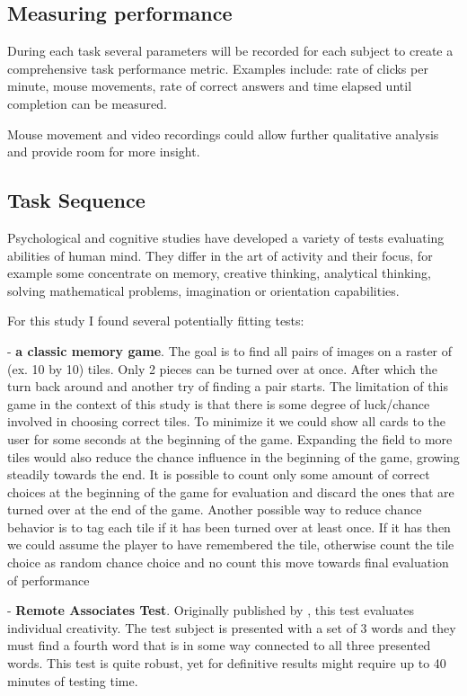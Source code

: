 \subsection{Measuring performance} \label{measuring}

During each task several parameters will be recorded for each subject to create a comprehensive task performance metric. 
Examples include: rate of clicks per minute, mouse movements, rate of correct answers and time elapsed until completion can be measured. 

Mouse movement and video recordings could allow further qualitative analysis and provide room for more insight.

\subsection{Task Sequence} \label{task_sequence}

Psychological and cognitive studies have developed a variety of tests evaluating abilities of human mind. 
They differ in the art of activity and their focus, for example some concentrate on memory, creative thinking, analytical thinking, solving mathematical problems, imagination or orientation capabilities.

For this study I found several potentially fitting tests:

- \textbf{a classic memory game}. The goal is to find all pairs of images on a raster of (ex. 10 by 10) tiles. 
Only 2 pieces can be turned over at once. 
After which the turn back around and another try of finding a pair starts. 
The limitation of this game in the context of this study is that there is some degree of luck/chance involved in choosing correct tiles. 
To minimize it we could show all cards to the user for some seconds at the beginning of the game.
Expanding the field to more tiles would also reduce the chance influence in the beginning of the game, growing steadily towards the end.
It is possible to count only some amount of correct choices at the beginning of the game for evaluation and discard the ones that are turned over at the end of the game.
Another possible way to reduce chance behavior is to tag each tile if it has been turned over at least once. If it has then we could assume the player to have remembered the tile, otherwise count the tile choice as random chance choice and no count this move towards final evaluation of performance

- \textbf{Remote Associates Test}. Originally published by \cite[p.226 ff]{Mednick1962}, this test evaluates individual creativity. 
The test subject is presented with a set of 3 words and they must find a fourth word that is in some way connected to all three presented words.
This test is quite robust, yet for definitive results might require up to 40 minutes of testing time.

